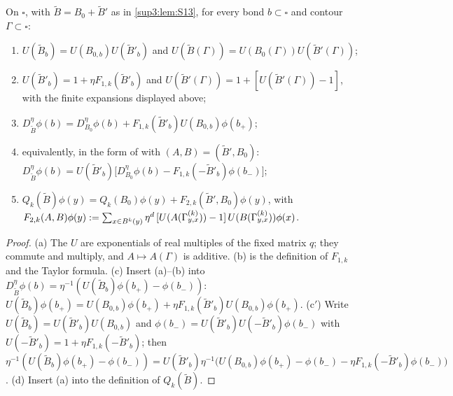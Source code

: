 \begin{lemma}\label{sup3:lem:S141}
On $\square$, with $\tilde B=B_0+\tilde B'$ as in \cref{sup3:lem:S13}, for every bond $b\subset\square$ and contour $\Gamma\subset\square$:
\begin{enumerate}[label=\textup{(\alph*)},nosep,leftmargin=*]
\item $U(\tilde B_b)=U(B_{0,b})U(\tilde B'_b)$ and $U(\tilde B(\Gamma))=U(B_0(\Gamma))U(\tilde B'(\Gamma))$;
\item $U(\tilde B'_b)=1+\eta F_{1,k}(\tilde B'_b)$ and $U(\tilde B'(\Gamma))=1+[U(\tilde B'(\Gamma))-1]$, with the finite expansions displayed above;
\item $D^\eta_{\tilde B}\phi(b)=D^\eta_{B_0}\phi(b)+F_{1,k}(\tilde B'_b)U(B_{0,b})\phi(b_+)$;
\item[\textup{(c$'$)}] equivalently, in the form of \cite[(3.44)]{Ba1} with $(A,B)=(\tilde B',B_0)$: $D^\eta_{\tilde B}\phi(b)=U(\tilde B'_b)\big[D^\eta_{B_0}\phi(b)-F_{1,k}(-\tilde B'_b)\phi(b_-)\big]$;
\item $Q_k(\tilde B)\phi(y)=Q_k(B_0)\phi(y)+F_{2,k}(\tilde B',B_0)\phi(y)$, with $F_{2,k}(A,B)\phi(y):=\sum_{x\in B^k(y)}\eta^d\,[U(A(\Gamma^{(k)}_{y,x}))-1]\,U(B(\Gamma^{(k)}_{y,x}))\phi(x)$.
\end{enumerate}
\end{lemma}

\begin{proof}
(a) The $U$ are exponentials of real multiples of the fixed matrix $q$; they commute and multiply, and $A\mapsto A(\Gamma)$ is additive. (b) is the definition of $F_{1,k}$ and the Taylor formula. (c) Insert (a)--(b) into $D^\eta_{\tilde B}\phi(b)=\eta^{-1}(U(\tilde B_b)\phi(b_+)-\phi(b_-))$: $U(\tilde B_b)\phi(b_+)=U(B_{0,b})\phi(b_+)+\eta F_{1,k}(\tilde B'_b)U(B_{0,b})\phi(b_+)$. (c$'$) Write $U(\tilde B_b)=U(\tilde B'_b)U(B_{0,b})$ and $\phi(b_-)=U(\tilde B'_b)U(-\tilde B'_b)\phi(b_-)$ with $U(-\tilde B'_b)=1+\eta F_{1,k}(-\tilde B'_b)$; then $\eta^{-1}(U(\tilde B_b)\phi(b_+)-\phi(b_-))=U(\tilde B'_b)\eta^{-1}\big(U(B_{0,b})\phi(b_+)-\phi(b_-)-\eta F_{1,k}(-\tilde B'_b)\phi(b_-)\big)$. (d) Insert (a) into the definition of $Q_k(\tilde B)$.
\end{proof}

